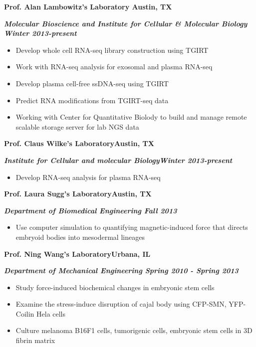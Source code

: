 \documentclass[dvips,11pt]{article}
\begin{document}
\noindent \centerline{\bf Prof. Alan Lambowitz's Laboratory \hfill	Austin, TX}
\noindent \centerline{\textit{\textbf{Molecular Bioscience and Institute for Cellular \& Molecular Biology  \hfill Winter 2013-present}}}
\vspace{-2mm}
\begin{itemize} \itemsep1pt \parskip0pt 
	\setlength{\itemsep}{0pt}
	\item Develop whole cell RNA-seq library construction using TGIRT
	\item Work with RNA-seq analysis for exosomal and plasma RNA-seq
	\item Develop plasma cell-free ssDNA-seq using TGIRT
	\item Predict RNA modifications from TGIRT-seq data
	\item Working with Center for Quantitative Biolody to build and manage remote scalable storage server for lab NGS data
\end{itemize}

\noindent \centerline{\bf Prof. Claus Wilke's Laboratory\hfill	Austin, TX}
\noindent \centerline{\textit {\textbf{Institute for Cellular and molecular Biology\hfill Winter 2013-present}}}
\vspace{-2mm}
\begin{itemize} \itemsep1pt \parskip0pt 
	\setlength{\itemsep}{0pt}
	\item Develop RNA-seq analysis for plasma RNA-seq
\end{itemize}

\noindent \centerline{\bf Prof. Laura Sugg's Laboratory\hfill	Austin, TX}
\noindent \centerline{\textbf{\textit{Department of Biomedical Engineering \hfill Fall 2013}}}
\vspace{-2mm}
\begin{itemize} \itemsep1pt \parskip0pt 
	\setlength{\itemsep}{0pt}
	\item Use computer simulation to quantifying magnetic-induced force that directs embryoid bodies into mesodermal lineages
\end{itemize}

\noindent \centerline{\bf Prof. Ning Wang's Laboratory\hfill Urbana, IL}
\noindent \centerline{\bf{\textit{Department of Mechanical Engineering \hfill Spring 2010 - Spring 2013} }}
\vspace{-2mm}
\begin{itemize} \itemsep1pt \parskip0pt 
	\setlength{\itemsep}{0pt}
	\item Study force-induced biochemical changes in embryonic stem cells
	\item Examine the stress-induce disruption of cajal body using CFP-SMN, YFP-Coilin Hela cells
	\item Culture melanoma B16F1 cells, tumorigenic cells, embryonic stem cells in 3D fibrin matrix
\end{itemize}
\end{document}
